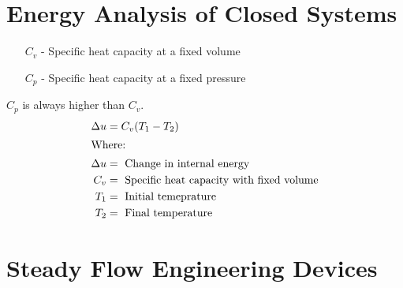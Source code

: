 \documentclass[12pt,a4paper]{article}
\begin{document}
\newpage

\section{Energy Analysis of Closed Systems}
    \begin{itemize}
        \item[$C_v$ -] Specific heat capacity at a fixed volume
        \item[$C_p$ -] Specific heat capacity at a fixed pressure 
    \end{itemize}
    $C_p$ is always higher than $C_v$. \\

    \begin{align}
        \Delta u&=C_v(T_1-T_2) \\
        \intertext{Where: }
        \Delta u&=\text{ Change in internal energy} \nonumber \\
        C_v&=\text{ Specific heat capacity with fixed volume} \nonumber \\
        T_1&=\text{ Initial temeprature} \nonumber\\
        T_2&=\text{ Final temperature} \nonumber
    \end{align} 
\newpage

\section{Steady Flow Engineering Devices}
\end{document}
